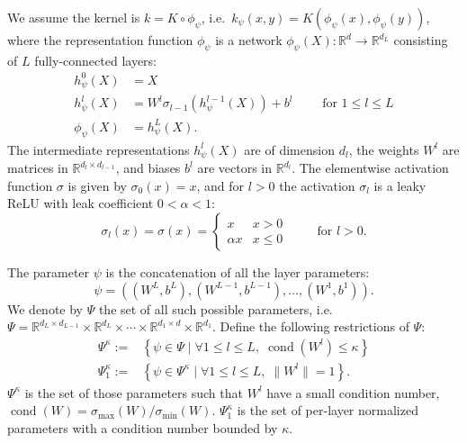 \documentclass{article}
\newcommand{\R}{\mathbb R}
\DeclareMathOperator{\cond}{cond}
\begin{document}
We assume the kernel is $k = K \circ \phi_\psi$,
i.e.\ $k_\psi(x, y) = K(\phi_\psi(x), \phi_\psi(y))$,
where the representation function $\phi_\psi$ is a network $\phi_\psi(X) : \R^d \to \R^{d_L}$
consisting of $L$ fully-connected layers:
\begin{align}
  h_{\psi}^{0}(X) &= X\nonumber
  \\
  h_{\psi}^{l}(X) &= W^l \sigma_{l-1}(h_{\psi}^{l-1}(X)) + b^{l}
  \qquad \text{ for } 1 \le l \leq L
  \label{eq:network}
  \\
  \phi_\psi(X) &= h_\psi^L(X)
  \nonumber
.\end{align}
The intermediate representations $h_\psi^l(X)$ are of dimension $d_l$,
the weights $W^{l}$ are matrices in $\R^{d_{l} \times d_{l-1}}$,
and biases $b^{l}$ are vectors in $\R^{d_{l}}$.
The elementwise activation function $\sigma$ is given by
$\sigma_0(x) = x$,
and for $l > 0$ the activation $\sigma_{l}$ is a leaky ReLU with
leak coefficient $0<\alpha<1$:
\begin{equation}
\sigma_{l}(x)= \sigma(x)=\begin{cases}
x & x>0\\
\alpha x & x\leq0
\end{cases}
\qquad \text{ for } l>0
\label{eq:lReLU}
.\end{equation}


The parameter $\psi$ is the concatenation of all the layer parameters:
\[
  \psi = \left( (W^{L},b^{L}), (W^{L-1},b^{L-1}), \dots, (W^{1}, b^{1}) \right)
.\]
We denote by $\Psi$ the set of all such possible parameters,
i.e.\ $\Psi = \R^{d_L \times d_{L-1}} \times \R^{d_L} \times \cdots \times \R^{d_1 \times d} \times \R^{d_1}$.
Define the following restrictions of $\Psi$:
\begin{align}
\Psi^{\kappa} :=& \left\{
    \psi \in \Psi \mid \forall 1 \le l \le L, \;
    \cond(W^l)\leq \kappa
  \right\}
  \label{eq:def:psi-kappa}
  \\
  \Psi^{\kappa}_1 :=& \left\{
    \psi \in \Psi^{\kappa} \mid \forall 1 \le l \le L, \;
    \lVert W^l \rVert = 1
  \right\}
  \label{eq:def:psi-kappa-1}
.\end{align}
$\Psi^{\kappa}$ is the set of those parameters such that $W^l$ have a small condition number,
$\cond(W) = \sigma_{\max}(W) / \sigma_{\min}(W)$.
$\Psi_1^{\kappa}$ is the set of per-layer normalized parameters with a condition number bounded by $\kappa$.
\end{document}
